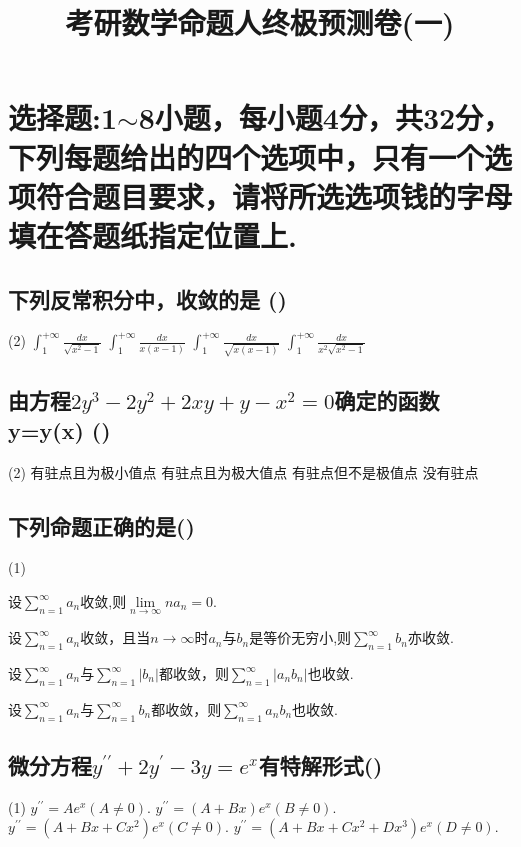 \documentclass[utf8]{ctexart}
\begin{document}
	\title{考研数学命题人终极预测卷(一)}
	\date{}
	\author{}
	\maketitle
\section {选择题:\textmd{1$\sim$8小题，每小题4分，共32分，下列每题给出的四个选项中，只有一个选项符合题目要求，请将所选选项钱的字母填在答题纸指定位置上.}}
\subsection{下列反常积分中，收敛的是 \hfill (\qquad)}
\begin{tasks}(2)
	\task  $\int_1^{+\infty}\frac{dx}{\sqrt{x^2-1}}$	
	\task  $\int_1^{+\infty}\frac{dx}{x(x-1)}$
	\task  $\int_1^{+\infty}\frac{dx}{\sqrt{x(x-1)}}$
	\task  $\int_1^{+\infty}\frac{dx}{x^2\sqrt{x^2-1}}$
\end{tasks}
\subsection{由方程$2y^3-2y^2+2xy+y-x^2=0$确定的函数y=y(x) \hfill (\qquad)}
\begin{tasks}(2)
	\task  有驻点且为极小值点
	\task  有驻点且为极大值点
	\task  有驻点但不是极值点
	\task  没有驻点
\end{tasks}
\subsection{下列命题正确的是\hfill (\qquad)}
\begin{tasks}(1)
	
	\task  设$\sum\limits_{n=1}^\infty a_n$收敛,则$\lim\limits_{n\to\infty}na_n=0$.
	
	\task  设$\sum\limits_{n=1}^\infty a_n$收敛，且当$n\to\infty$时$a_n$与$b_n$是等价无穷小,则$\sum\limits_{n=1}^\infty b_n$亦收敛.
		
	\task  设$\sum\limits_{n=1}^\infty a_n$与$\sum\limits_{n=1}^\infty |b_n|$都收敛，则$\sum\limits_{n=1}^\infty |a_n b_n|$也收敛.
	
	\task  设$\sum\limits_{n=1}^\infty a_n$与$\sum\limits_{n=1}^\infty b_n$都收敛，则$\sum\limits_{n=1}^\infty a_n b_n$也收敛.	
\end{tasks}
\subsection{微分方程$y^{\prime\prime}+2y^\prime-3y=e^x$有特解形式\hfill (\qquad)}
\begin{tasks}(1)
	\task $y^{\prime\prime}=Ae^x(A\neq 0).$
	\task $y^{\prime\prime}=(A+Bx)e^x(B\neq 0).$
	\task $y^{\prime\prime}=(A+Bx+Cx^2)e^x(C\neq 0).$
	\task $y^{\prime\prime}=(A+Bx+Cx^2+Dx^3)e^x(D\neq 0).$
\end{tasks}
\end{document}
